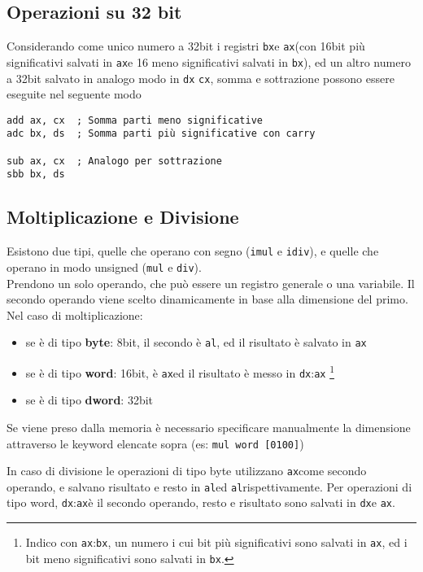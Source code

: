 \documentclass[../template]{subfiles}
\begin{document}
\subsection{Operazioni su 32 bit}
\newcommand\ax{\lstinline{ax}}
\newcommand\bx{\lstinline{bx}}
\newcommand\dx{\lstinline{dx}}
\newcommand\al{\lstinline{al}}
\newcommand\ah{\lstinline{al}}


Considerando come unico numero a 32bit i registri \bx e \ax (con 16bit più significativi salvati in \ax e
16 meno significativi salvati in \bx), ed un altro numero a 32bit salvato in analogo modo in \lstinline{dx} \lstinline{cx},
somma e sottrazione possono essere eseguite nel seguente modo
\begin{lstlisting}
add ax, cx  ; Somma parti meno significative
adc bx, ds  ; Somma parti più significative con carry

sub ax, cx  ; Analogo per sottrazione
sbb bx, ds
\end{lstlisting}
\newpage
\subsection{Moltiplicazione e Divisione}
Esistono due tipi, quelle che operano con segno (\lstinline{imul} e \lstinline{idiv}), e quelle che operano in
modo unsigned (\lstinline{mul} e \lstinline{div}).
\\
Prendono un solo operando, che può essere un registro generale o una variabile. Il secondo operando viene scelto dinamicamente
in base alla dimensione del primo. Nel caso di moltiplicazione:

\begin{itemize}
    \item se è di tipo \textbf{byte}: 8bit, il secondo è \al, ed il risultato è salvato in \ax
    \item se è di tipo \textbf{word}: 16bit, è \ax ed il risultato è messo in \dx:\ax
        \footnote{Indico con \ax:\bx, un numero i cui bit più significativi sono salvati in \ax, ed i bit meno significativi sono salvati in \bx.}
    \item se è di tipo \textbf{dword}: 32bit
\end{itemize}
Se viene preso dalla memoria è necessario specificare manualmente la dimensione attraverso le keyword elencate sopra (es: \lstinline{mul word [0100]})

\vspace{10pt}
\noindent
In caso di divisione le operazioni di tipo byte utilizzano \ax come secondo operando, e salvano risultato e resto in \al ed \ah rispettivamente.
Per operazioni di tipo word, \dx:\ax è il secondo operando, resto e risultato sono salvati in \dx e \ax.
\end{document}
